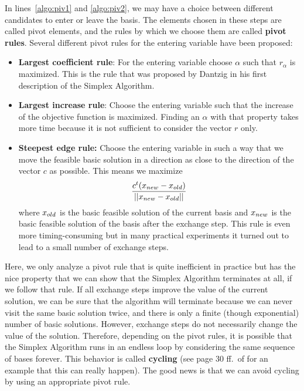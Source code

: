 \documentclass[12pt, showidx, twoside]{article}
\def\hi{\bf}
\begin{document}
{{{In lines~\ref{algo:piv1} and \ref{algo:piv2}, we may have a choice between
different candidates to enter or leave the basis. The elements chosen
in these steps are called pivot elements, and the rules by which we choose
them are called {\hi pivot rules}{}. Several different 
pivot rules for the entering variable have been proposed:
\begin{itemize}
   \item {\hi Largest coefficient rule}:{}
       For the entering variable choose
       $\alpha$ such that $r_\alpha$ is maximized. This is the rule 
       that was proposed by Dantzig in his first description of the 
       {\sc Simplex Algorithm}.
   \item {\hi Largest increase rule}:{}
       Choose the entering variable such
       that the increase of the objective function is maximized. Finding
       an $\alpha$ with that property takes more time because it is not  
       sufficient to consider the vector $r$ only.
   \item {\hi Steepest edge rule:}{}
       Choose the entering 
       variable in such a way that we move the feasible basic solution
       in a direction as close to the direction of the vector $c$ as possible.
       This means we maximize 
       \[
         \frac{c^t(x_{\scriptsize{new}} - x_{\scriptsize{old}}) }
              {|| x_{\scriptsize{new}} - x_{\scriptsize{old}} || }
       \]
       where $x_{\scriptsize{old}}$ is the basic feasible solution of the
       current basis and $x_{\scriptsize{new}}$ is the basic feasible solution
       of the basis after the exchange step. This rule is even more 
       timing-consuming but in many practical experiments it turned out
       to lead to a small number of exchange steps.
\end{itemize}



Here, we only analyze a pivot rule that is quite inefficient in practice but has
the nice property that we can show that the {\sc Simplex Algorithm} terminates
at all, if we follow that rule.
If all exchange steps improve the value of the current solution, we can be
sure that the algorithm will terminate because we can never visit the same
basic solution twice, and there is only a finite (though exponential) number
of basic solutions. 
However, exchange steps do not necessarily change the value of the solution.
Therefore, depending on the pivot rules, it is possible that the
{\sc Simplex Algorithm} runs in an endless loop by considering the same
sequence of bases forever. This behavior is called
{\hi cycling}{} (see page 30 ff.\ of \cite{Chv83} for an example
that this can really happen). The good news is that we can avoid cycling
by using an appropriate pivot rule.

}}}
\end{document}
